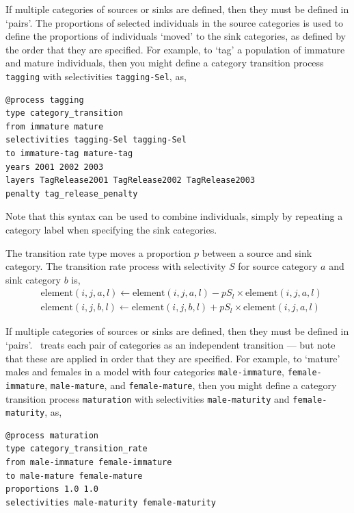 If multiple categories of sources or sinks are defined, then they must be defined in `pairs'. The proportions of selected individuals in the source categories is used to define the proportions of individuals `moved' to the sink categories, as defined by the order that they are specified. For example, to `tag' a population of immature and mature individuals, then you might define a category transition process \texttt{tagging} with selectivities \texttt{tagging-Sel}, as,

{\small{\begin{verbatim}
@process tagging
type category_transition
from immature mature
selectivities tagging-Sel tagging-Sel
to immature-tag mature-tag
years 2001 2002 2003
layers TagRelease2001 TagRelease2002 TagRelease2003
penalty tag_release_penalty
\end{verbatim}}}

Note that this syntax can be used to combine individuals, simply by repeating a category label when specifying the sink categories.

The transition rate type moves a proportion $p$ between a source and sink category. The transition rate process with selectivity $S$ for source category $a$ and sink category $b$ is,
\begin{equation}\begin{split}
  & \text{element}(i,j,a,l) \leftarrow \text{element}(i,j,a,l) - pS_l \times \text{element}(i,j,a,l) \\
  & \text{element}(i,j,b,l) \leftarrow \text{element}(i,j,b,l) + pS_l \times \text{element}(i,j,a,l)
\end{split}\end{equation}

If multiple categories of sources or sinks are defined, then they must be defined in `pairs'. \SPM\ treats each pair of categories as an independent transition --- but note that these are applied in order that they are specified. For example, to `mature' males and females in a model with four categories \texttt{male-immature}, \texttt{female-immature}, \texttt{male-mature}, and \texttt{female-mature}, then you might define a category transition process \texttt{maturation} with selectivities \texttt{male-maturity} and \texttt{female-maturity}, as,

{\small{\begin{verbatim}
@process maturation
type category_transition_rate
from male-immature female-immature
to male-mature female-mature
proportions 1.0 1.0
selectivities male-maturity female-maturity
\end{verbatim}}}

